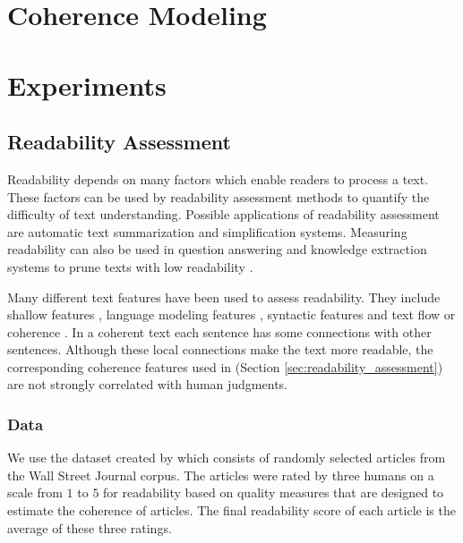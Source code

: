 \section{Coherence Modeling}
\label{sec:automatic_extraction}



\section{Experiments}
\label{sec:experiments}

    \subsection{Readability Assessment}
    \label{subsec:readability_assessment}


        Readability depends on many factors which enable readers to process a text. 
        These factors can be used by readability assessment methods to quantify the difficulty of text understanding. 
        Possible applications of readability assessment are automatic text summarization and simplification systems. Measuring readability can also be used in
        question answering and knowledge extraction systems to prune texts with low readability \cite{kate10}.
        
        Many different text features have been used to assess readability. 
        They include shallow features \cite{flesch48,kincaid75}, language modeling features \cite{siluo01,collins-thompson04}, syntactic features \cite{schwarm05} and text flow or coherence \cite{barzilay08,pitler08}. 
        In a coherent text each sentence has some connections with other sentences. 
        Although these local connections make the text more readable, the corresponding coherence features used
        in  (Section \ref{sec:readability_assessment}) are not strongly correlated with human judgments.


            \subsubsection{Data}
            We use the dataset created by  which consists of randomly selected articles from the Wall Street Journal corpus. 
            The articles were rated by three humans on a scale from $1$ to $5$ for readability based on quality measures that are designed to estimate the coherence of articles. The final readability score of each article is the average of these three ratings.
            
